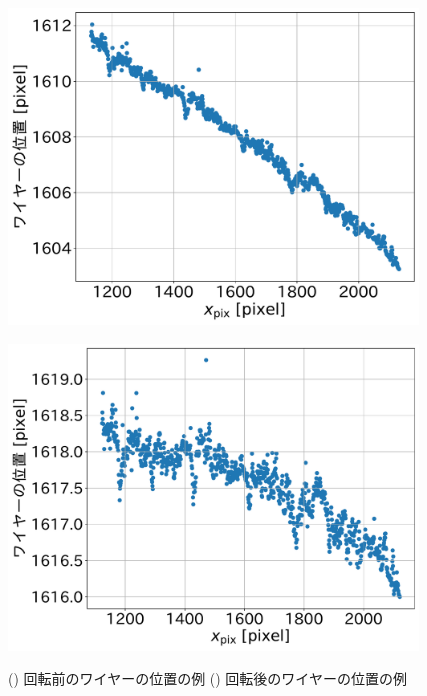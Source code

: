\documentclass[../../main.tex]{subfiles}
\begin{document}
\begin{figure}[H]
    \begin{minipage}[b]{0.5\hsize}
        \centering
        \includegraphics[width=0.97\textwidth]{wiresag/wiresag_wire_positions.pdf}
        \subcaption{}
        \label{fig:wiresag_wire_positions_line}
    \end{minipage}
    \begin{minipage}[b]{0.5\hsize}
        \centering
        \includegraphics[width=0.97\textwidth]{wiresag/wiresag_wire_positions_rot.pdf}
        \subcaption{}
        \label{fig:wiresag_wire_positions_rot}
    \end{minipage}
    \caption{() 回転前のワイヤーの位置の例
             () 回転後のワイヤーの位置の例
             }
    \label{fig:wiresag_wire_positions}
\end{figure}
\end{document}
